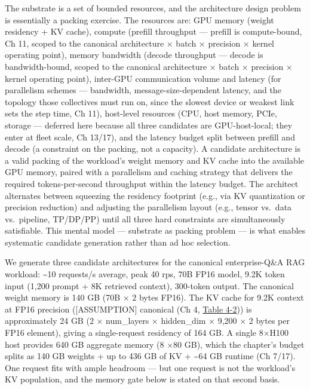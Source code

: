 \label{mental-model}


The substrate is a set of bounded resources, and the architecture design
problem is essentially a packing exercise. The resources are: GPU memory
(weight residency + KV cache), compute (prefill throughput --- prefill
is compute-bound, Ch 11, scoped to the canonical architecture × batch ×
precision × kernel operating point), memory bandwidth (decode throughput
--- decode is bandwidth-bound, scoped to the canonical architecture ×
batch × precision × kernel operating point), inter-GPU communication
volume and latency (for parallelism schemes --- bandwidth,
message-size-dependent latency, and the topology those collectives must
run on, since the slowest device or weakest link sets the step time, Ch
11), host-level resources (CPU, host memory, PCIe, storage --- deferred
here because all three candidates are GPU-host-local; they enter at
fleet scale, Ch 13/17), and the latency budget split between prefill and
decode (a constraint on the packing, not a capacity). A candidate
architecture is a valid packing of the workload's weight memory and KV
cache into the available GPU memory, paired with a parallelism and
caching strategy that delivers the required tokens-per-second throughput
within the latency budget. The architect alternates between squeezing
the residency footprint (e.g., via KV quantization or precision
reduction) and adjusting the parallelism layout (e.g., tensor vs.~data
vs.~pipeline, TP/DP/PP) until all three hard constraints are
simultaneously satisfiable. This mental model --- substrate as packing
problem --- is what enables systematic candidate generation rather than
ad hoc selection.

\label{worked-example}


We generate three candidate architectures for the canonical
enterprise-Q\&A RAG workload: \textasciitilde10 requests/s average, peak
40 rps, 70B FP16 model, 9.2K token input (1,200 prompt + 8K retrieved
context), 300-token output. The canonical weight memory is 140 GB (70B ×
2 bytes FP16). The KV cache for 9.2K context at FP16 precision
(\mbox{{[}ASSUMPTION{]}} canonical (Ch 4, \hyperref[tab:4.2]{Table 4-2})) is approximately 24 GB (2
× num\_layers × hidden\_dim × 9,200 × 2 bytes per FP16 element), giving
a single-request residency of 164 GB. A single 8×H100 host provides 640
GB aggregate memory (8 ×80 GB), which the chapter's budget splits as 140
GB weights + up to 436 GB of KV + \textasciitilde64 GB runtime (Ch
7/17). One request fits with ample headroom --- but one request is not
the workload's KV population, and the memory gate below is stated on
that second basis.

